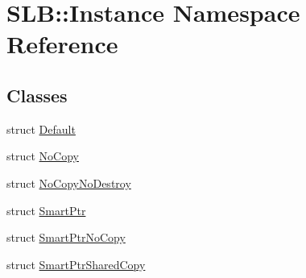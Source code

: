 \hypertarget{namespaceSLB_1_1Instance}{}\section{S\+LB\+:\+:Instance Namespace Reference}
\label{namespaceSLB_1_1Instance}
\subsection*{Classes}
\begin{DoxyCompactItemize}
\item 
struct \hyperlink{structSLB_1_1Instance_1_1Default}{Default}
\item 
struct \hyperlink{structSLB_1_1Instance_1_1NoCopy}{No\+Copy}
\item 
struct \hyperlink{structSLB_1_1Instance_1_1NoCopyNoDestroy}{No\+Copy\+No\+Destroy}
\item 
struct \hyperlink{structSLB_1_1Instance_1_1SmartPtr}{Smart\+Ptr}
\item 
struct \hyperlink{structSLB_1_1Instance_1_1SmartPtrNoCopy}{Smart\+Ptr\+No\+Copy}
\item 
struct \hyperlink{structSLB_1_1Instance_1_1SmartPtrSharedCopy}{Smart\+Ptr\+Shared\+Copy}
\end{DoxyCompactItemize}
